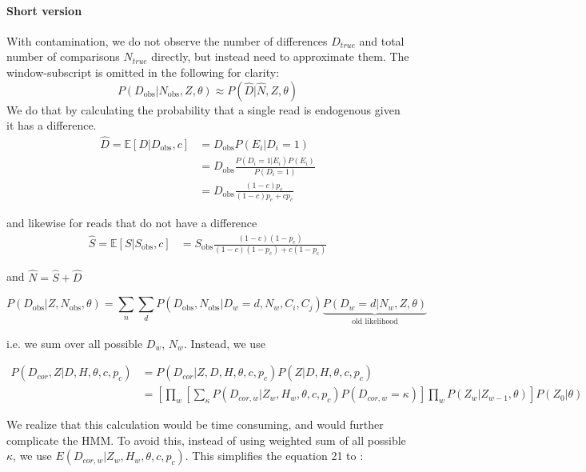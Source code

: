 \documentclass[12pt, letterpaper]{article}
\begin{document}
\paragraph{Short version}
With contamination, we do not observe the number of differences $D_{true}$ and total number of comparisons $N_{true}$ directly, but instead need to approximate them. The window-subscript is omitted in the following for clarity:
\begin{equation}
    P(D_{\text{obs}} | N_\text{obs}, Z, \theta) \approx 
    P( \hat{D} | \hat{N}, Z, \theta)
\end{equation}
We do that by calculating the probability that a single read is endogenous given it has a difference.
\begin{align}
    \hat{D} = \mathbb{E}[D | D_{\text{obs}}, c] &= 
    D_{\text{obs}} P(E_i | D_i=1) \\
    &= D_\text{obs} \frac{P(D_i=1 | E_i)P(E_i)}{P(D_i=1)}\\
    &= D_\text{obs} \frac{(1-c)p_e}{(1-c)p_e + c p_c}
\end{align}

and likewise for reads that do not have a difference
\begin{align}
    \hat{S} = \mathbb{E}[S | S_{\text{obs}}, c] &= 
     S_\text{obs} \frac{(1-c)(1-p_e)}{(1-c)(1-p_e) + c (1-p_c)}
\end{align}

and $\hat{N} = \hat{S} + \hat{D}$

\begin{equation}
    P(D_{\text{obs}} | Z, N_\text{obs}, \theta) = \sum_n\sum_d P(D_{\text{obs}}, N_\text{obs} | D_w=d, N_w, C_i, C_j)\underbrace{P(D_w=d | N_w, Z, \theta)}_\text{old likelihood}
\end{equation}

i.e. we sum over all possible $D_w$, $N_w$. Instead, we use

\begin{align}
    P(D_{cor},Z|D,H,\theta,c,p_c) &= P(D_{cor}|Z,D,H,\theta,c,p_c) P(Z|D,H,\theta,c,p_c)\nonumber\\
    &= [\prod_{w} [\sum_\kappa P(D_{cor,w}|Z_w, H_w, \theta,c,p_c) P(D_{cor,w}=\kappa)] \prod_{w} P(Z_w|Z_{w-1}, \theta)] P(Z_0| \theta)
\end{align}



We realize that this calculation would be time consuming, and would further complicate the HMM. To avoid this, instead of using weighted sum of all possible $\kappa$, we use $E(D_{cor,w}|Z_w, H_w, \theta,c,p_c)$. This simplifies the equation 21 to :
\end{document}
